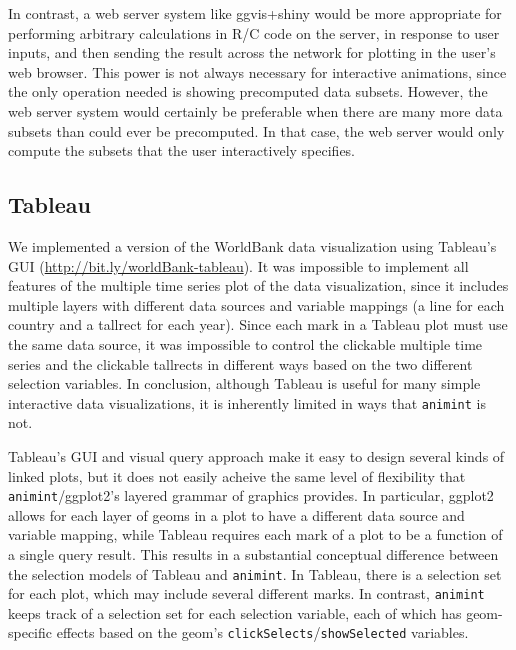\documentclass[journal]{vgtc}\usepackage[]{graphicx}\usepackage[]{color}
\begin{document}
In contrast, a web server system like ggvis+shiny would be more
appropriate for
performing arbitrary calculations in R/C code on the server, in
response to user inputs, and then sending the result across the
network for plotting in the user's web browser. This power is not
always necessary for interactive animations, since the only operation
needed is showing precomputed data subsets. However, the web server
system would certainly be preferable when there are many more data
subsets than could ever be precomputed. In that case, the web server
would only compute the subsets that the user interactively specifies.

\subsection{Tableau}

We implemented a version of the WorldBank data visualization using
Tableau's GUI (\url{http://bit.ly/worldBank-tableau}).
It was impossible to implement all features of the multiple time
series plot of the data visualization, since it includes multiple
layers with different data sources and variable mappings (a line for
each country and a tallrect for each year). Since each mark in a
Tableau plot must use the same data source, it was impossible to
control the clickable multiple time series and the clickable tallrects
in different ways based on the two different selection variables. In
conclusion, although Tableau is useful for many simple interactive
data visualizations, it is inherently limited in ways that
\texttt{animint} is not.

Tableau's GUI and visual query approach
make it easy to design several kinds of linked plots, but it does not
easily acheive the same level of flexibility that \texttt{animint}/ggplot2's
layered grammar of graphics provides. In particular, ggplot2 allows
for each layer of geoms in a plot to have a different data source and
variable mapping, while Tableau requires each mark of a plot to be a
function of a single query result. This results in a substantial
conceptual difference between the selection models of Tableau and
\texttt{animint}. In Tableau, there is a selection set for each plot, which may
include several different marks. In contrast, \texttt{animint} keeps track of a
selection set for each selection variable, each of which has
geom-specific effects based on the geom's \texttt{clickSelects}/\texttt{showSelected}
variables.
\end{document}
